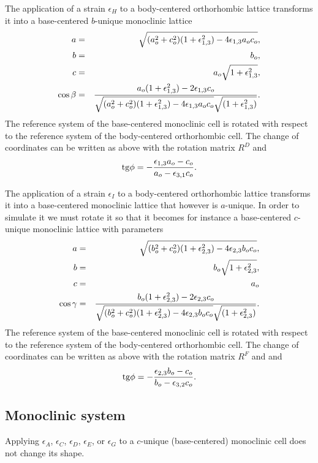 \documentclass[12pt,a4paper]{article}
\begin{document}
The application of a strain $\epsilon_H$ to a body-centered orthorhombic
lattice transforms it into a base-centered $b$-unique monoclinic lattice 
\begin{eqnarray}
a&=&\sqrt{(a_o^2+c_o^2)(1+\epsilon_{1,3}^2)-4\epsilon_{1,3}a_oc_o}, \\
b&=&b_o, \\
c&=&a_o \sqrt{1+\epsilon_{1,3}^2}, \\
\cos\beta &=& {a_o (1+\epsilon_{1,3}^2) -2 \epsilon_{1,3} c_o \over 
\sqrt{(a_o^2+c_o^2)(1+\epsilon_{1,3}^2)-4\epsilon_{1,3}a_oc_o} 
\sqrt{(1+\epsilon_{1,3}^2)}}.
\end{eqnarray}
The reference system of the base-centered monoclinic cell is rotated 
with respect to the reference system of the body-centered orthorhombic cell. 
The change of coordinates can be written as above with the rotation matrix 
$R^D$ and
\begin{equation}
{\rm tg} \phi = -{\epsilon_{1,3} a_o - c_o \over a_o - \epsilon_{3,1} c_o}.
\end{equation}

The application of a strain $\epsilon_I$ to a body-centered orthorhombic
lattice transforms it into a base-centered monoclinic lattice that however
is $a$-unique. In order to simulate it we must rotate it so that it
becomes for instance a base-centered $c$-unique monoclinic lattice with
parameters
\begin{eqnarray}
a&=&\sqrt{(b_o^2+c_o^2)(1+\epsilon_{2,3}^2)-4\epsilon_{2,3}b_oc_o}, \\
b&=&b_o \sqrt{1+\epsilon_{2,3}^2}, \\
c&=&a_o \\
\cos\gamma &=& {b_o (1+\epsilon_{2,3}^2) -2 \epsilon_{2,3} c_o \over 
\sqrt{(b_o^2+c_o^2)(1+\epsilon_{2,3}^2)-4\epsilon_{2,3}b_oc_o} 
\sqrt{(1+\epsilon_{2,3}^2)}}.
\end{eqnarray}
The reference system of the base-centered monoclinic cell is rotated 
with respect to the reference system of the body-centered orthorhombic cell. 
The change of coordinates can be written as above with the rotation matrix 
$R^F$ and
and 
\begin{equation}
{\rm tg} \phi = -{\epsilon_{2,3} b_o - c_o \over b_o - \epsilon_{3,2} c_o}.
\end{equation}

\subsection{\color{web-blue} Monoclinic system}
Applying $\epsilon_A$, $\epsilon_C$, $\epsilon_D$, $\epsilon_E$, or
$\epsilon_G$ to a $c$-unique (base-centered) monoclinic cell does 
not change its shape.
\end{document}
